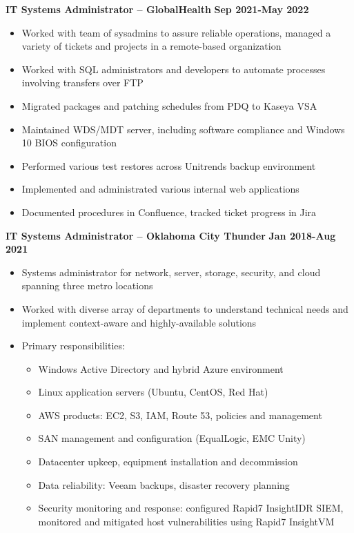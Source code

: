 \documentclass[line]{res}
\begin{document}
\begin{resume}
\textbf{IT Systems Administrator -- GlobalHealth}
\newline
\textbf{Sep 2021-May 2022}
\begin{itemize}
	\item Worked with team of sysadmins to assure reliable operations, managed a variety of tickets and projects in a remote-based organization
	\item Worked with SQL administrators and developers to automate processes involving transfers over FTP
	\item Migrated packages and patching schedules from PDQ to Kaseya VSA
	\item Maintained WDS/MDT server, including software compliance and Windows 10 BIOS configuration
	\item Performed various test restores across Unitrends backup environment
	\item Implemented and administrated various internal web applications
	\item Documented procedures in Confluence, tracked ticket progress in Jira 
\end{itemize}
\textbf{IT Systems Administrator -- Oklahoma City Thunder}
\newline
\textbf{Jan 2018-Aug 2021}
\begin{itemize}
	\item Systems administrator for network, server, storage, security, and cloud spanning three metro locations
	\item Worked with diverse array of departments to understand technical needs and implement context-aware and highly-available solutions
	\item Primary responsibilities:
		\begin{itemize}
			\item Windows Active Directory and hybrid Azure environment
			\item Linux application servers (Ubuntu, CentOS, Red Hat)
			\item AWS products: EC2, S3, IAM, Route 53, policies and management
			\item SAN management and configuration (EqualLogic, EMC Unity)
			\item Datacenter upkeep, equipment installation and decommission
			\item Data reliability: Veeam backups, disaster recovery planning
			\item Security monitoring and response: configured Rapid7 InsightIDR SIEM, monitored and mitigated host vulnerabilities using Rapid7 InsightVM

\end{itemize}
\end{itemize}
\end{resume}
\end{document}
